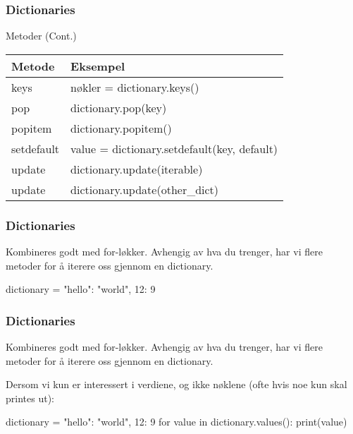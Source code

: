 \begin{frame}
    \frametitle{Dictionaries}

    Metoder (Cont.)

    \begin{table}[]
        \begin{tabular}{|l|l|}
        \hline
        Metode     & Eksempel                                    \\ \hline
        keys       & nøkler = dictionary.keys()                  \\ \hline
        pop        & dictionary.pop(key)                         \\ \hline
        popitem    & dictionary.popitem()                        \\ \hline
        setdefault & value = dictionary.setdefault(key, default) \\ \hline
        update     & dictionary.update(iterable)                 \\ \hline
        update     & dictionary.update(other\_dict)              \\ \hline
        \end{tabular}
    \end{table}

\end{frame}

\begin{frame}[fragile]
    \frametitle{Dictionaries}

    Kombineres godt med for-løkker. Avhengig av hva du trenger, har vi flere metoder for å iterere oss gjennom en dictionary. 

\begin{python}
dictionary = {"hello": "world", 12: 9}
\end{python}

\end{frame}

\begin{frame}[fragile]
    \frametitle{Dictionaries}

    Kombineres godt med for-løkker. Avhengig av hva du trenger, har vi flere metoder for å iterere oss gjennom en dictionary. 

    Dersom vi kun er interessert i verdiene, og ikke nøklene (ofte hvis noe kun skal printes ut): 

\begin{python}
dictionary = {"hello": "world", 12: 9}
for value in dictionary.values(): 
    print(value)
\end{python}

\end{frame}

